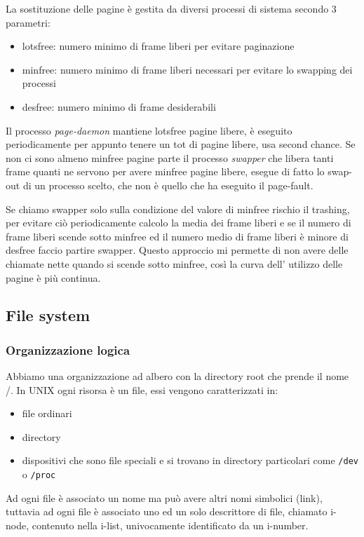 La sostituzione delle pagine è gestita da diversi processi di sistema secondo 3 parametri:
\begin{itemize}
    \item lotsfree: numero minimo di frame liberi per evitare paginazione
    \item minfree: numero minimo di frame liberi necessari per evitare lo swapping dei processi
    \item desfree: numero minimo di frame desiderabili
\end{itemize}
Il processo \emph{page-daemon} mantiene lotsfree pagine libere, è eseguito periodicamente per appunto tenere un tot di pagine libere, usa second chance.
Se non ci sono almeno minfree pagine parte il processo \emph{swapper} che libera tanti frame quanti ne servono per avere minfree pagine libere, esegue di fatto lo swap-out di un processo scelto, che non è quello che ha eseguito il page-fault.

Se chiamo swapper solo sulla condizione del valore di minfree rischio il trashing, per evitare ciò periodicamente calcolo la media dei frame liberi e se il numero di frame liberi scende sotto minfree ed il numero medio di frame liberi è minore di desfree faccio partire swapper.
Questo approccio mi permette di non avere delle chiamate nette quando si scende sotto minfree, così la curva dell' utilizzo delle pagine è più continua.

\subsection{File system}
\subsubsection{Organizzazione logica}
Abbiamo una organizzazione ad albero con la directory root che prende il nome /.
In UNIX ogni risorsa è un file, essi vengono caratterizzati in:
\begin{itemize}
    \item file ordinari
    \item directory
    \item dispositivi che sono file speciali e si trovano in directory particolari come \verb{/dev{ o \verb{/proc{
\end{itemize}

Ad ogni file è associato un nome ma può avere altri nomi simbolici (link), tuttavia ad ogni file è associato uno ed un solo descrittore di file, chiamato i-node, contenuto nella i-list, univocamente identificato da un i-number.

